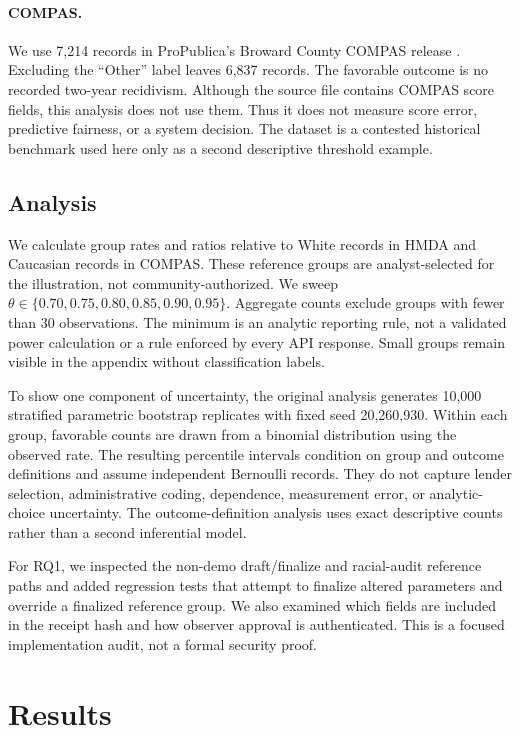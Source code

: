 \documentclass[10pt]{article}
\begin{document}
\paragraph{COMPAS.}
We use 7,214 records in ProPublica's Broward County COMPAS release
\cite{angwin2016,propublicaData}. Excluding the ``Other'' label leaves 6,837 records. The
favorable outcome is no recorded two-year recidivism. Although the source file
contains COMPAS score fields, this analysis does not use them. Thus it does not
measure score error, predictive fairness, or a system decision. The dataset is
a contested historical benchmark used here only as a second descriptive
threshold example.

\subsection{Analysis}

We calculate group rates and ratios relative to White records in HMDA and
Caucasian records in COMPAS. These reference groups are analyst-selected for
the illustration, not community-authorized. We sweep
$\theta\in\{0.70,0.75,0.80,0.85,0.90,0.95\}$. Aggregate counts exclude groups
with fewer than 30 observations. The minimum is an analytic reporting rule,
not a validated power calculation or a rule enforced by every API response.
Small groups remain visible in the appendix without classification labels.

To show one component of uncertainty, the original analysis generates 10,000
stratified parametric bootstrap replicates with fixed seed 20,260,930. Within
each group, favorable counts are drawn from a binomial distribution using the
observed rate. The resulting percentile intervals condition on group and
outcome definitions and assume independent Bernoulli records. They do not
capture lender selection, administrative coding, dependence, measurement error,
or analytic-choice uncertainty. The outcome-definition analysis uses exact
descriptive counts rather than a second inferential model.

For RQ1, we inspected the non-demo draft/finalize and racial-audit reference
paths and added regression tests that attempt to finalize altered parameters
and override a finalized reference group. We also examined which fields are
included in the receipt hash and how observer approval is authenticated. This
is a focused implementation audit, not a formal security proof.

\section{Results}
\end{document}
